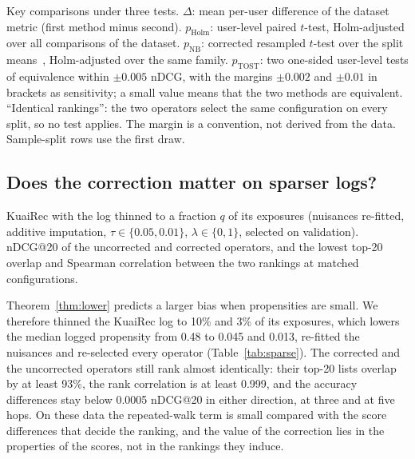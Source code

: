\documentclass[preprint,review,12pt,authoryear]{elsarticle}
\theoremstyle{definition}
\begin{document}
\begin{table}[t]\centering\scriptsize
\caption{Key comparisons under three tests. $\Delta$: mean per-user difference of the dataset metric (first method minus second).
$p_{\mathrm{Holm}}$: user-level paired $t$-test, Holm-adjusted over all comparisons of the dataset.
$p_{\mathrm{NB}}$: corrected resampled $t$-test over the split means~\citep{nadeau2003}, Holm-adjusted over the same family. $p_{\mathrm{TOST}}$: two
one-sided user-level tests of equivalence within $\pm0.005$ nDCG, with the margins $\pm0.002$ and $\pm0.01$ in brackets as sensitivity; a small value means that
the two methods are equivalent. ``Identical rankings'': the two operators select the same configuration on every split, so no test applies. The margin is a convention, not derived from the data. Sample-split rows use the first draw.}\label{tab:nbtost}
\begin{adjustbox}{max width=\textwidth}

\end{adjustbox}
\end{table}

\subsection{Does the correction matter on sparser logs?}\label{sec:sparse}

\begin{table}[t]\centering\small
\caption{KuaiRec with the log thinned to a fraction $q$ of its exposures
(nuisances re-fitted, additive imputation, $\tau\in\{0.05,0.01\}$, $\lambda\in\{0,1\}$,
selected on validation). nDCG@20 of the uncorrected and corrected operators, and
the lowest top-20 overlap and Spearman correlation between the two rankings at
matched configurations.}\label{tab:sparse}
\begin{adjustbox}{max width=\textwidth}

\end{adjustbox}
\end{table}

Theorem~\ref{thm:lower} predicts a larger bias when propensities are small. We
therefore thinned the KuaiRec log to 10\% and 3\% of its exposures, which lowers the
median logged propensity from 0.48 to 0.045 and 0.013, re-fitted the nuisances
and re-selected every operator (Table~\ref{tab:sparse}). The corrected and the
uncorrected operators still rank almost identically: their top-20 lists overlap
by at least 93\%, the rank correlation is at least 0.999, and the accuracy
differences stay below 0.0005 nDCG@20 in either direction, at three and at five
hops. On these data the repeated-walk term is small compared with the score
differences that decide the ranking, and the value of the correction lies in
the properties of the scores, not in the rankings they induce.
\end{document}
